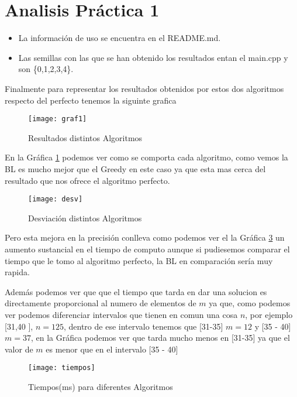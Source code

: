 \section{Analisis Práctica 1}
\begin{itemize}
  \item La información de uso se encuentra en el README.md.
  \item Las semillas con las que se han obtenido los resultados entan el main.cpp y son \{0,1,2,3,4\}.
\end{itemize}

Finalmente para representar los resultados obtenidos por estos dos algoritmos respecto del perfecto tenemos la siguinte grafica
\begin{figure}[h]
  \centering
  \texttt{[image: graf1]}
  \caption{Resultados distintos Algoritmos}
  \label{gra}
\end{figure}


En la Gráfica \ref{gra} podemos ver como se comporta cada algoritmo, como vemos la BL es mucho mejor que el Greedy en este caso ya que 
esta mas cerca del resultado que nos ofrece el algoritmo perfecto.\newpage


\begin{figure}[h]
  \centering
  \texttt{[image: desv]}
  \caption{Desviación distintos Algoritmos}
  \label{gra2}
\end{figure}

Pero esta mejora en la precisión conlleva como podemos ver el la Gráfica \ref{gra3} un aumento sustancial en el tiempo de computo
aunque si pudiesemos comparar el tiempo que le tomo al algoritmo perfecto, la BL en comparación sería muy rapida.

Además podemos ver que que el tiempo que tarda en dar una solucion es directamente proporcional al numero de elementos de $m$ ya
que, como podemos ver podemos diferenciar intervalos que tienen en comun una cosa $n$, por ejemplo [31,40 ], $n = 125$, dentro de ese
intervalo tenemos que [31-35] $m =12 $ y [35 - 40] $m =37 $, en la Gráfica podemos ver que tarda mucho menos en [31-35]
ya que el valor de $m$ es menor que en el intervalo [35 - 40]

\begin{figure}[h]
  \centering
  \texttt{[image: tiempos]}
  \caption{Tiempos(ms) para diferentes Algoritmos}
  \label{gra3}
\end{figure}



